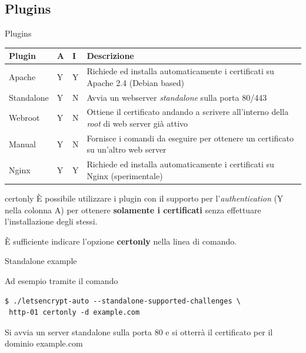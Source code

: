 \documentclass[xcolor=svgnames,11pt]{beamer}
\begin{document}
\subsection{Plugins}
\begin{frame}{Plugins}
\begin{center}
\begin{tabular}{p{2cm}p{0.5cm}p{0.5cm}p{5cm}}
\hline
\textbf{Plugin} & \textbf{A} & \textbf{I} & \textbf{Descrizione}\\
\hline
Apache & Y & Y & {\scriptsize Richiede ed installa automaticamente i certificati su Apache 2.4 (Debian based)} \\
Standalone & Y & N & {\scriptsize Avvia un webserver \emph{standalone} sulla porta 80/443} \\
Webroot & Y & N & {\scriptsize Ottiene il certificato andando a scrivere all'interno della \emph{root} di web server già attivo}\\
Manual & Y & N & {\scriptsize Fornisce i comandi da eseguire per ottenere un certificato su un'altro web server} \\
Nginx & Y & Y & {\scriptsize Richiede ed installa automaticamente i certificati su Nginx (sperimentale)} \\
\hline
\end{tabular}
\end{center}
\end{frame}


\begin{frame}[fragile]{certonly}
È possibile utilizzare i plugin con il supporto per l'\emph{authentication} (Y nella colonna A)
per ottenere \textbf{solamente i certificati} senza effettuare l'installazione degli stessi.

\medskip\pause

È sufficiente indicare l'opzione \textbf{certonly} nella linea di comando.

\medskip

\begin{block}{Standalone example}

Ad esempio tramite il comando
\begin{scriptsize}
\begin{verbatim}
$ ./letsencrypt-auto --standalone-supported-challenges \
 http-01 certonly -d example.com
\end{verbatim}
\end{scriptsize}

Si avvia un server standalone sulla porta 80 e si otterrà il certificato per il dominio example.com
\end{block}
\end{frame}
\end{document}
